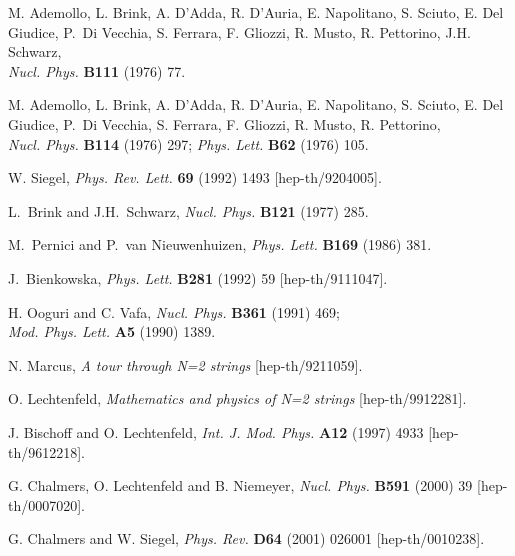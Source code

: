 \documentclass[a4paper,11pt]{article}
\begin{document}
\vfill\eject
\begin{thebibliography}{99}

M. Ademollo, L. Brink, A. D'Adda, R. D'Auria, E. Napolitano, S. Sciuto, 
E. Del Giudice, P.~Di Vecchia, S. Ferrara, F. Gliozzi, R. Musto, R. Pettorino, 
J.H. Schwarz,\\
{\sl Nucl. Phys.} {\bf B111} (1976) 77. 

M. Ademollo, L. Brink, A. D'Adda, R. D'Auria, E. Napolitano, S. Sciuto, 
E. Del Giudice, P.~Di Vecchia, S. Ferrara, F. Gliozzi, R. Musto, 
R. Pettorino,\\
{\sl Nucl. Phys.} {\bf B114} (1976) 297;
{\sl Phys. Lett.} {\bf B62} (1976) 105.

W. Siegel,
{\sl Phys. Rev. Lett.} {\bf 69} (1992) 1493 [hep-th/9204005].

L.~Brink and J.H.~Schwarz,
{\sl Nucl. Phys.} {\bf B121} (1977) 285.

M.~Pernici and P.~van Nieuwenhuizen,
{\sl Phys. Lett.} {\bf B169} (1986) 381.

J.~Bienkowska,
{\sl Phys. Lett.} {\bf B281} (1992) 59 
[hep-th/9111047].

H. Ooguri and C. Vafa,
{\sl Nucl. Phys.} {\bf B361} (1991) 469;\\
{\sl Mod. Phys. Lett.} {\bf A5} (1990) 1389.

N. Marcus,
{\it A tour through N=2 strings}
[hep-th/9211059].

O. Lechtenfeld,
{\it Mathematics and physics of N=2 strings}
[hep-th/9912281].

J. Bischoff and O. Lechtenfeld,
{\sl Int. J. Mod. Phys.} {\bf A12} (1997) 4933 
[hep-th/9612218].

G. Chalmers, O. Lechtenfeld and B. Niemeyer,
{\sl Nucl. Phys.} {\bf B591} (2000) 39 
[hep-th/0007020].

G. Chalmers and W. Siegel,
{\sl Phys. Rev.} {\bf D64} (2001) 026001 
[hep-th/0010238].


\end{thebibliography}
\end{document}

